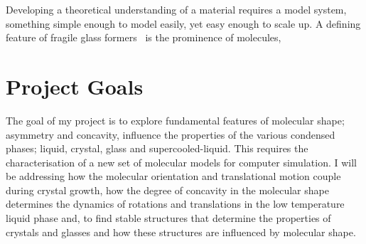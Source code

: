 Developing a theoretical understanding of a material requires a model system, something simple enough to model easily, yet easy enough to scale up. A defining feature of fragile glass formers~\tabref{} is the prominence of molecules, 


\begin{figure}
    \caption{}
    \label{fig:entropy}
\end{figure}

\section{Project Goals}

The goal of my project is to explore fundamental features of molecular shape; asymmetry and concavity, influence the properties of the various condensed phases; liquid, crystal, glass and supercooled-liquid. This requires the characterisation of a new set of molecular models for computer simulation. I will be addressing how the molecular orientation and translational motion couple during crystal growth, how the degree of concavity in the molecular shape determines the dynamics of rotations and translations in the low temperature liquid phase and, to find stable structures that determine the properties of crystals and glasses and how these structures are influenced by molecular shape.

